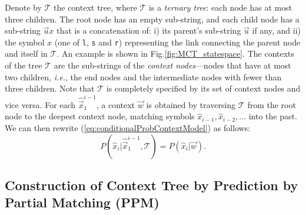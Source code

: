 Denote by $\mathcal{T}$ the context tree, where $\mathcal{T}$ is a \textit{ternary tree}: each node has at most three children. 
The root node has an empty sub-string, and each child node has a sub-string $\vec{u}x$ that is a concatenation of: i) its parent's sub-string $\vec{u}$ if any, and ii) the symbol $x$ (one of \texttt{l}, \texttt{s} and \texttt{r}) representing the link connecting the parent node and itself in $\mathcal{T}$. 
An example is shown in Fig.\;\ref{fig:MCT_statespace}.
The contexts of the tree $\mathcal{T}$ are the sub-strings of the \textit{context nodes}---nodes that have at most two children, \textit{i.e.}, the end nodes and the intermediate nodes with fewer than three children. 
Note that $\mathcal{T}$ is completely specified by its set of context nodes and vice versa.
For each $\hat{\vec{x}}^{i-1}_{1}$, a context $\vec{w}$ is obtained by traversing $\mathcal{T}$ from the root node to the deepest context node, matching symbols $\hat{x}_{i-1}, \hat{x}_{i-2}, \ldots$ into the past.
We can then rewrite (\ref{eq:conditionalProbContextModel}) as follows:
\begin{equation}
P(\hat{x}_i|\hat{\vec{x}}^{i-1}_{1}, \mathcal{T})=P(\hat{x}_i|\vec{w}).
\label{eq:conditionalProbContextTree}
\end{equation}


\subsection{Construction of Context Tree by Prediction by Partial Matching (PPM)}
\label{subsec:PPM}


